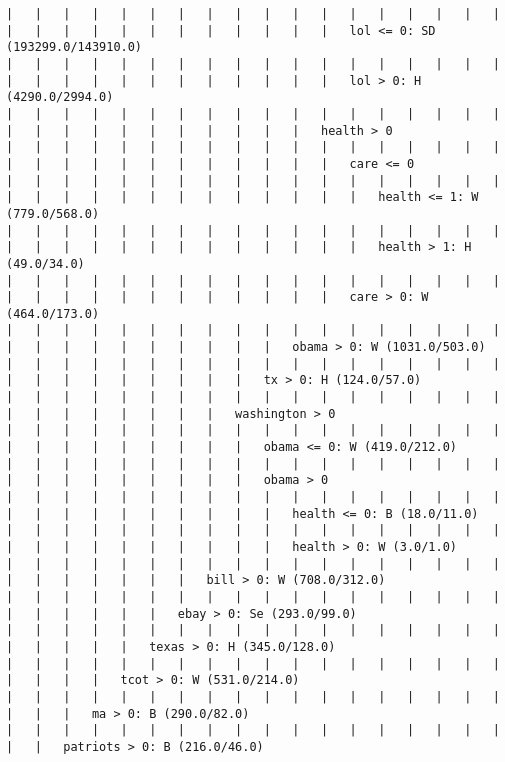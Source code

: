 \documentclass[a4paper]{article}
\begin{document}
\begin{landscape}
\begin{verbatim}
|   |   |   |   |   |   |   |   |   |   |   |   |   |   |   |   |   |   |   |   |   |   |   |   |   |   |   |   |   |   lol <= 0: SD (193299.0/143910.0)
|   |   |   |   |   |   |   |   |   |   |   |   |   |   |   |   |   |   |   |   |   |   |   |   |   |   |   |   |   |   lol > 0: H (4290.0/2994.0)
|   |   |   |   |   |   |   |   |   |   |   |   |   |   |   |   |   |   |   |   |   |   |   |   |   |   |   |   |   health > 0
|   |   |   |   |   |   |   |   |   |   |   |   |   |   |   |   |   |   |   |   |   |   |   |   |   |   |   |   |   |   care <= 0
|   |   |   |   |   |   |   |   |   |   |   |   |   |   |   |   |   |   |   |   |   |   |   |   |   |   |   |   |   |   |   health <= 1: W (779.0/568.0)
|   |   |   |   |   |   |   |   |   |   |   |   |   |   |   |   |   |   |   |   |   |   |   |   |   |   |   |   |   |   |   health > 1: H (49.0/34.0)
|   |   |   |   |   |   |   |   |   |   |   |   |   |   |   |   |   |   |   |   |   |   |   |   |   |   |   |   |   |   care > 0: W (464.0/173.0)
|   |   |   |   |   |   |   |   |   |   |   |   |   |   |   |   |   |   |   |   |   |   |   |   |   |   |   |   obama > 0: W (1031.0/503.0)
|   |   |   |   |   |   |   |   |   |   |   |   |   |   |   |   |   |   |   |   |   |   |   |   |   |   |   tx > 0: H (124.0/57.0)
|   |   |   |   |   |   |   |   |   |   |   |   |   |   |   |   |   |   |   |   |   |   |   |   |   |   washington > 0
|   |   |   |   |   |   |   |   |   |   |   |   |   |   |   |   |   |   |   |   |   |   |   |   |   |   |   obama <= 0: W (419.0/212.0)
|   |   |   |   |   |   |   |   |   |   |   |   |   |   |   |   |   |   |   |   |   |   |   |   |   |   |   obama > 0
|   |   |   |   |   |   |   |   |   |   |   |   |   |   |   |   |   |   |   |   |   |   |   |   |   |   |   |   health <= 0: B (18.0/11.0)
|   |   |   |   |   |   |   |   |   |   |   |   |   |   |   |   |   |   |   |   |   |   |   |   |   |   |   |   health > 0: W (3.0/1.0)
|   |   |   |   |   |   |   |   |   |   |   |   |   |   |   |   |   |   |   |   |   |   |   |   |   bill > 0: W (708.0/312.0)
|   |   |   |   |   |   |   |   |   |   |   |   |   |   |   |   |   |   |   |   |   |   |   |   ebay > 0: Se (293.0/99.0)
|   |   |   |   |   |   |   |   |   |   |   |   |   |   |   |   |   |   |   |   |   |   |   texas > 0: H (345.0/128.0)
|   |   |   |   |   |   |   |   |   |   |   |   |   |   |   |   |   |   |   |   |   |   tcot > 0: W (531.0/214.0)
|   |   |   |   |   |   |   |   |   |   |   |   |   |   |   |   |   |   |   |   |   ma > 0: B (290.0/82.0)
|   |   |   |   |   |   |   |   |   |   |   |   |   |   |   |   |   |   |   |   patriots > 0: B (216.0/46.0)

\end{verbatim}
\end{landscape}
\end{document}
